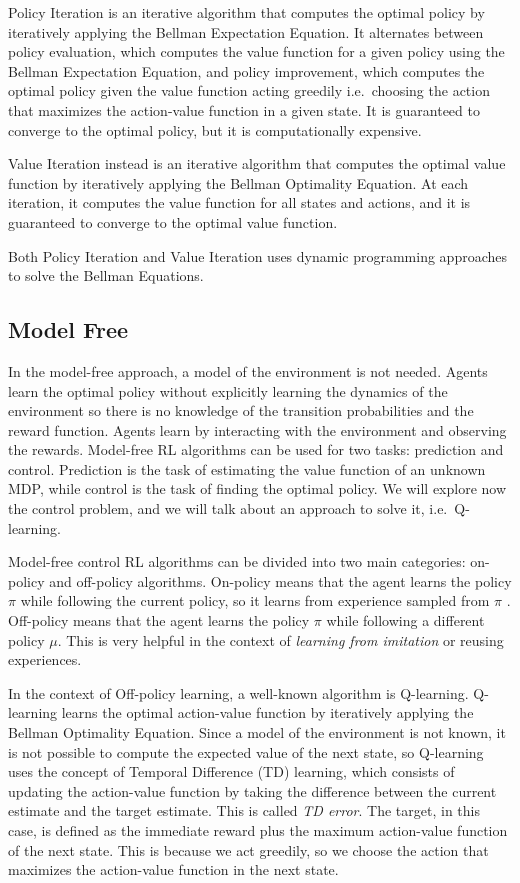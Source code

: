 Policy Iteration is an iterative algorithm that computes the optimal policy by iteratively applying the Bellman Expectation Equation.
It alternates between policy evaluation, which computes the value function for a given policy using the Bellman Expectation Equation, and policy improvement, which computes the optimal policy given the value function acting greedily i.e.\ choosing the action that maximizes the action-value function in a given state.
It is guaranteed to converge to the optimal policy, but it is computationally expensive.

Value Iteration instead is an iterative algorithm that computes the optimal value function by iteratively applying the Bellman Optimality Equation.
At each iteration, it computes the value function for all states and actions, and it is guaranteed to converge to the optimal value function.

Both Policy Iteration and Value Iteration uses dynamic programming approaches to solve the Bellman Equations.

\subsection{Model Free}
In the model-free approach, a model of the environment is not needed.
Agents learn the optimal policy without explicitly learning the dynamics of the environment so there is no knowledge of the transition probabilities and the reward function.
Agents learn by interacting with the environment and observing the rewards.
Model-free RL algorithms can be used for two tasks: prediction and control.
Prediction is the task of estimating the value function of an unknown MDP, while control is the task of finding the optimal policy.
We will explore now the control problem, and we will talk about an approach to solve it, i.e.\ Q-learning.


Model-free control RL algorithms can be divided into two main categories: on-policy and off-policy algorithms.
On-policy means that the agent learns the policy $\pi$ while following the current policy, so it learns from experience sampled from $\pi$ .
Off-policy means that the agent learns the policy $\pi$ while following a different policy $\mu$.
This is very helpful in the context of \textit{learning from imitation} or reusing experiences.

In the context of Off-policy learning, a well-known algorithm is Q-learning.
Q-learning learns the optimal action-value function by iteratively applying the Bellman Optimality Equation.
Since a model of the environment is not known, it is not possible to compute the expected value of the next state, so Q-learning uses the concept of Temporal Difference (TD) learning, which consists of updating the action-value function by taking the difference between the current estimate and the target estimate.
This is called \textit{TD error}.
The target, in this case, is defined as the immediate reward plus the maximum action-value function of the next state.
This is because we act greedily, so we choose the action that maximizes the action-value function in the next state.

